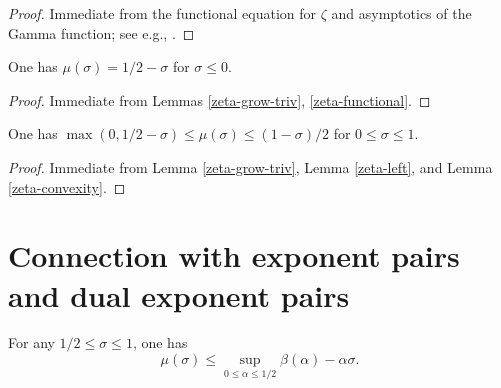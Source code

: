 
\begin{proof}  Immediate from the functional equation for $\zeta$ and asymptotics of the Gamma function; see e.g., \cite[(1.23), (1.25)]{ivic}.
\end{proof}

\begin{lemma}\label{zeta-left}
    One has $\mu(\sigma)=1/2-\sigma$ for $\sigma \leq 0$.
\end{lemma}


\begin{proof}  Immediate from Lemmas \ref{zeta-grow-triv}, \ref{zeta-functional}.
\end{proof}

\begin{lemma}\label{zeta-convexity}  One has $\max(0, 1/2-\sigma) \leq \mu(\sigma) \leq (1-\sigma)/2$ for $0 \leq \sigma \leq 1$.
\end{lemma}


\begin{proof}  Immediate from Lemma \ref{zeta-grow-triv}, Lemma \ref{zeta-left}, and Lemma \ref{zeta-convexity}.
\end{proof}

\section{Connection with exponent pairs and dual exponent pairs}

\begin{lemma}\label{mu-beta}\label{zeta-grow-def, beta-def}  For any $1/2 \leq \sigma \leq 1$, one has
    $$ \mu(\sigma) \leq \sup_{0 \leq \alpha \leq 1/2} \beta(\alpha) - \alpha \sigma.$$
\end{lemma}

